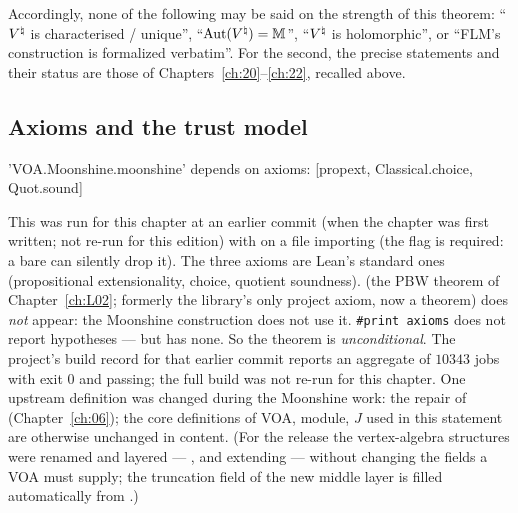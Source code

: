 Accordingly, none of the following may be said on the strength of this theorem: ``${V^{\natural}}$ is characterised
/ unique'', ``$\operatorname{Aut}({V^{\natural}})=\mathbb M$'', ``${V^{\natural}}$ is holomorphic'', or ``FLM's construction is formalized
verbatim''.  For the second, the precise statements and their status are those of Chapters~\ref{ch:20}--\ref{ch:22},
recalled above.

\subsection{Axioms and the trust model}

\begin{plaincode}
'VOA.Moonshine.moonshine' depends on axioms: [propext, Classical.choice, Quot.sound]
\end{plaincode}
This was run for this chapter at an earlier commit (when the chapter was first written; not re-run for this edition) with
 on a file importing 
(the flag is required: a bare  can silently drop it).  The three axioms are Lean's
standard ones (propositional extensionality, choice, quotient soundness).   (the PBW theorem of
Chapter~\ref{ch:L02}; formerly the library's only project axiom, now a theorem) does \emph{not} appear: the Moonshine construction does not use it.
\texttt{\#print axioms} does not report hypotheses — but  has none.  So the theorem is
\emph{unconditional}.  The project's build record for that earlier commit reports an aggregate
 of $10343$ jobs with exit $0$ and  passing; the full
build was not re-run for this chapter.  One upstream definition was changed during the Moonshine work:
the repair of  (Chapter~\ref{ch:06}); the core definitions of
VOA, module, $J$ used in this statement are otherwise unchanged in content.  (For the release the vertex-algebra
structures were renamed and layered --- , and  extending
 --- without changing the fields a VOA must supply; the truncation field of the new
middle layer is filled automatically from .)


